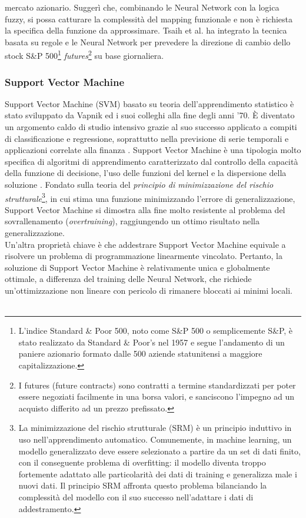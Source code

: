 \documentclass[a4paper,12pt]{report}
\begin{document}
mercato azionario. Suggerì che, combinando le Neural Network con la logica fuzzy, si possa catturare la complessità del mapping funzionale e non è richiesta la specifica della funzione da approssimare. Tsaih et al. \cite{41} ha integrato la tecnica basata su regole e le Neural Network per prevedere la direzione di cambio dello stock S\&P 500\footnote{L'indice Standard \& Poor 500, noto come S\&P 500 o semplicemente S\&P, è stato realizzato da Standard \& Poor's nel 1957 e segue l'andamento di un paniere azionario formato dalle 500 aziende statunitensi a maggiore capitalizzazione.} \textit{futures}\footnote{I futures (future contracts) sono contratti a termine standardizzati per poter essere negoziati facilmente in una borsa valori, e sanciscono l'impegno ad un acquisto differito ad un prezzo prefissato. } su base giornaliera.

\subsubsection{Support Vector Machine}
Support Vector Machine (SVM) basato su teoria dell'apprendimento statistico è stato sviluppato da Vapnik \cite{44} ed i suoi colleghi alla fine degli anni '70. È diventato un argomento caldo di studio intensivo grazie al suo successo applicato a compiti di classificazione e regressione, soprattutto nella previsione di serie temporali e applicazioni correlate alla finanza \cite{46}. Support Vector Machine è una tipologia molto specifica di algoritmi di apprendimento caratterizzato dal controllo della capacità della funzione di decisione, l'uso delle funzioni del kernel e la dispersione della soluzione \cite{43}. Fondato sulla teoria del \textit{principio di minimizzazione del rischio strutturale}\footnote{La minimizzazione del rischio strutturale (SRM) è un principio induttivo in uso nell'apprendimento automatico. Comunemente, in machine learning, un modello generalizzato deve essere selezionato a partire da un set di dati finito, con il conseguente problema di overfitting: il modello diventa troppo fortemente adattato alle particolarità dei dati di training e generalizza male i nuovi dati. Il principio SRM affronta questo problema bilanciando la complessità del modello con il suo successo nell'adattare i dati di addestramento.}, in cui stima una funzione minimizzando l'errore di generalizzazione, Support Vector Machine si dimostra alla fine molto resistente al problema del sovrallenamento (\textit{overtraining}), raggiungendo un ottimo risultato nella generalizzazione.\\ Un'altra proprietà chiave è che addestrare Support Vector Machine equivale a risolvere un problema di programmazione linearmente vincolato. Pertanto, la soluzione di Support Vector Machine è relativamente unica e globalmente ottimale, a differenza del training delle Neural Network, che richiede un'ottimizzazione non lineare con pericolo di rimanere bloccati ai minimi locali.\\~\\ 
\end{document}
